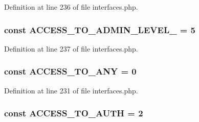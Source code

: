 Definition at line 236 of file interfaces.php.

\hypertarget{group__constants__acl__indices_gaff610796a797e6a609363e5ab6028ca0}{
\subsubsection[{ACCESS\_\-TO\_\-ADMIN\_\-LEVEL\_\-2}]{\setlength{\rightskip}{0pt plus 5cm}const ACCESS\_\-TO\_\-ADMIN\_\-LEVEL\_ = 5}}
\label{group__constants__acl__indices_gaff610796a797e6a609363e5ab6028ca0}


Definition at line 237 of file interfaces.php.

\hypertarget{group__constants__acl__indices_ga8b17406db740d630ae61ecf3cd9bbd8c}{
\subsubsection[{ACCESS\_\-TO\_\-ANY}]{\setlength{\rightskip}{0pt plus 5cm}const ACCESS\_\-TO\_\-ANY = 0}}
\label{group__constants__acl__indices_ga8b17406db740d630ae61ecf3cd9bbd8c}


Definition at line 231 of file interfaces.php.

\hypertarget{group__constants__acl__indices_ga437b41cb9e13e41157d57e7736366295}{
\subsubsection[{ACCESS\_\-TO\_\-AUTH}]{\setlength{\rightskip}{0pt plus 5cm}const ACCESS\_\-TO\_\-AUTH = 2}}
\label{group__constants__acl__indices_ga437b41cb9e13e41157d57e7736366295}


